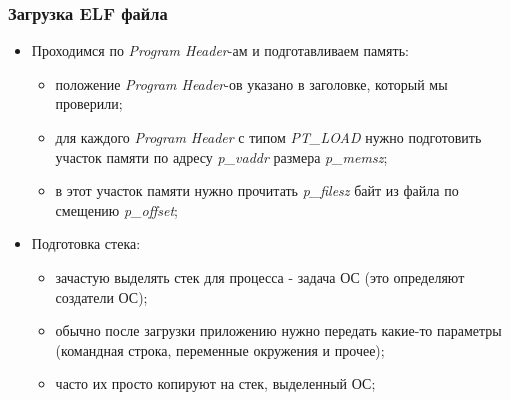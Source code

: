 \begin{frame}
\frametitle{Загрузка ELF файла}
\begin{itemize}
  \item<1-> Проходимся по \emph{Program Header}-ам и подготавливаем память:
    \begin{itemize}
      \item положение \emph{Program Header}-ов указано в заголовке, который мы проверили;
      \item для каждого \emph{Program Header} с типом \emph{PT\_LOAD} нужно подготовить участок памяти по адресу \emph{p\_vaddr} размера \emph{p\_memsz};
      \item в этот участок памяти нужно прочитать \emph{p\_filesz} байт из файла по смещению \emph{p\_offset};
    \end{itemize}
  \item<2-> Подготовка стека:
    \begin{itemize}
      \item зачастую выделять стек для процесса - задача ОС (это определяют создатели ОС);
      \item обычно после загрузки приложению нужно передать какие-то параметры (командная строка, переменные окружения и прочее);
      \item часто их просто копируют на стек, выделенный ОС;
    \end{itemize}
\end{itemize}
\end{frame}
